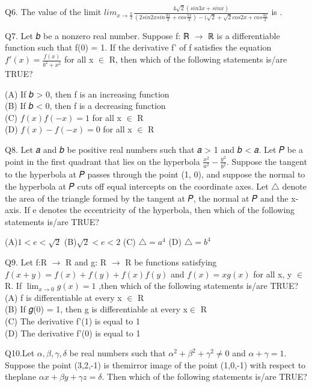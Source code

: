 \documentclass{article}
\begin{document}
Q6. The value of the limit
         \smallskip
	 $lim_{x \to \frac{\pi}{2}}\frac{4\sqrt{2}(sin3x + sinx)}{(2 sin2xsin\frac{3x}{2} + cos\frac{5x}{2}) - (\sqrt{2}+\sqrt{2}cos2x + cos\frac{3x}{2}}$ is \underline{\hspace{1cm}}.\\
	 \medskip

Q7. Let 𝑏 be a nonzero real number. Suppose f: ℝ $\to$ ℝ is a differentiable function such that f(0) = 1.
If the derivative f' of f satisfies the equation
               \smallskip
	       $f'(x) = \frac{f(x)}{b^2 + x^2}$
	       \smallskip
for all x $\in$ R, then which of the following statements is/are TRUE?

(A) If 𝑏 > 0, then f is an increasing function\\
(B) If 𝑏 < 0, then f is a decreasing function \\
(C) $f(x)f(-x) = 1$ for all x $\in$ R\\
(D) $f(x) - f(-x) = 0$ for all x $\in$ R
\medskip

Q8. Let 𝑎 and 𝑏 be positive real numbers such that 𝑎 > 1 and 𝑏 < 𝑎. Let 𝑃 be a point in the first 
quadrant that lies on the hyperbola $\frac{x^2}{a^2} - \frac{y^2}{b^2}$. Suppose the tangent to the hyperbola at 𝑃 passes 
through the point (1, 0), and suppose the normal to the hyperbola at 𝑃 cuts off equal intercepts on 
the coordinate axes. Let $\triangle$ denote the area of the triangle formed by the tangent at 𝑃, the normal at 𝑃
and the x-axis. If e denotes the eccentricity of the hyperbola, then which of the following statements 
is/are TRUE?

(A)$1< e <\sqrt{2}$ \quad (B)$\sqrt{2}< e <2$ \quad (C) $\triangle = a^4$ (D) $\triangle = b^4$\\
\medskip

Q9. Let f:R $\to$ R and g: R $\to$ R be functions satisfying
\smallskip
$f(x + y) = f(x) + f(y) + f(x)f(y)$ and $f(x) = xg(x)$
for all x, y $\in$ R. If $\lim_{x \to 0}g(x) = 1$
,then which of the following statements is/are TRUE?\\
\smallskip
(A) f is differentiable at every x $\in$ R\\
(B) If 𝑔(0) = 1, then g is differentiable at every x$\in$ R\\
(C) The derivative f'(1) is equal to 1\\
(D) The derivative f'(0) is equal to 1
\medskip

Q10.Let $\alpha,\beta,\gamma,\delta$ be real numbers such that $\alpha^2 + \beta^2 + \gamma^2 \neq 0$ and $\alpha + \gamma = 1$. Suppose the point (3,2,-1) is themirror image of the point (1,0,-1) with respect to theplane ${\alpha}x + {\beta}y + {\gamma}z = \delta$. 
Then which of the following statements is/are TRUE?\\
\medskip
\end{document}
